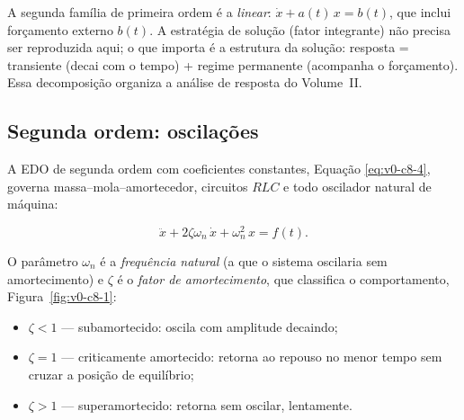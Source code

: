 \documentclass[12pt,a4paper]{article}
\numberwithin{equation}{section}
\numberwithin{table}{section}
\numberwithin{figure}{section}
\begin{document}
A segunda família de primeira ordem é a \emph{linear}:
$\dot{x} + a(t)\,x = b(t)$, que inclui forçamento externo $b(t)$. A
estratégia de solução (fator integrante) não precisa ser reproduzida aqui;
o que importa é a estrutura da solução: resposta = transiente (decai com
o tempo) + regime permanente (acompanha o forçamento). Essa decomposição
organiza a análise de resposta do Volume~II.

\subsection{Segunda ordem: oscilações}

A EDO de segunda ordem com coeficientes constantes, Equação
\eqref{eq:v0-c8-4}, governa massa--mola--amortecedor, circuitos $RLC$ e
todo oscilador natural de máquina:

\begin{equation}\label{eq:v0-c8-4}
\ddot{x} + 2\zeta\omega_n\,\dot{x} + \omega_n^2\,x = f(t).
\end{equation}

O parâmetro $\omega_n$ é a \emph{frequência natural} (a que o sistema
oscilaria sem amortecimento) e $\zeta$ é o \emph{fator de amortecimento},
que classifica o comportamento, Figura~\ref{fig:v0-c8-1}:

\begin{itemize}
\item $\zeta < 1$ --- subamortecido: oscila com amplitude decaindo;
\item $\zeta = 1$ --- criticamente amortecido: retorna ao repouso no menor
  tempo sem cruzar a posição de equilíbrio;
\item $\zeta > 1$ --- superamortecido: retorna sem oscilar, lentamente.
\end{itemize}
\end{document}
